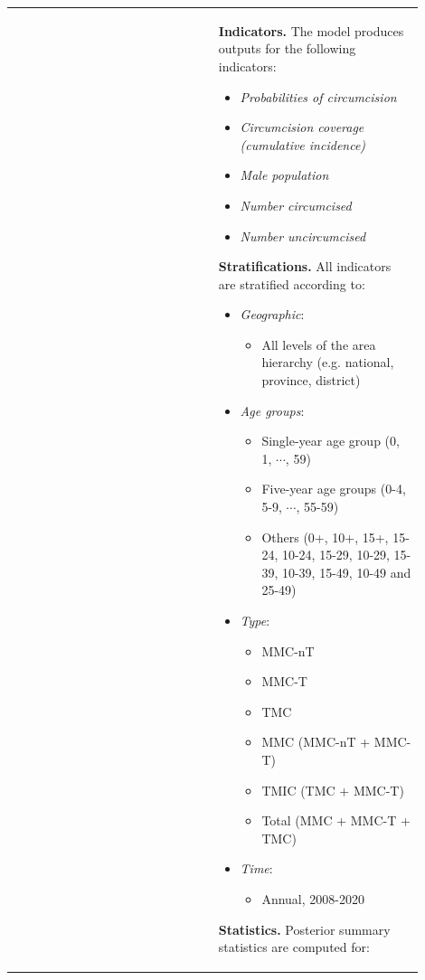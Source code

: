 \documentclass{article}
\begin{document}
\begin{appendix}
{\begin{table}[H]
\begin{tabular}{| p{0.45\linewidth} | p{0.45\linewidth} |}
		& 
			{\bf Indicators.} The model produces outputs for the following indicators: 
			\begin{itemize}
				\item {\it Probabilities of circumcision}
				\item {\it Circumcision coverage (cumulative incidence)}
				\item {\it Male population}
				\item {\it Number circumcised}
				\item {\it Number uncircumcised}
			\end{itemize}
			\vspace{5pt}
			{\bf Stratifications.} All indicators are stratified according to: 
			\begin{itemize}
				\item {\it Geographic}: 
				\begin{itemize}
					\item All levels of the area hierarchy (e.g. national, province, district)
				\end{itemize}
				\item {\it Age groups}: 
				\begin{itemize}
					\item Single-year age group (0, 1, $\cdots$, 59)
					\item Five-year age groups (0-4, 5-9, $\cdots$, 55-59)
					\item Others (0+, 10+, 15+, 15-24, 10-24, 15-29, 10-29, 15-39, 10-39, 15-49, 10-49 and 25-49)
				\end{itemize}
				\item {\it Type}: 
				\begin{itemize}
					\item MMC-nT
					\item MMC-T
					\item TMC
					\item MMC (MMC-nT + MMC-T)
					\item TMIC (TMC + MMC-T)
					\item Total (MMC + MMC-T + TMC)
				\end{itemize}
				\item {\it Time}: 
				\begin{itemize}
					\item Annual, 2008-2020
				\end{itemize}
			\end{itemize}
			\vspace{5pt}
			{\bf Statistics.} Posterior summary statistics are computed for:

\end{tabular}
\end{table}}
\end{appendix}
\end{document}
